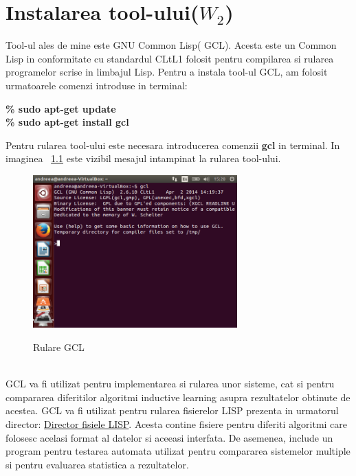\documentclass[a4paper,12pt]{report}
\begin{document}
\vspace{0.5cm}

\chapter{Instalarea tool-ului($W_2$)}
	Tool-ul ales de mine este GNU Common Lisp( GCL). Acesta este un Common Lisp in conformitate cu standardul CLtL1 folosit pentru compilarea si rularea programelor scrise in limbajul Lisp. Pentru a instala tool-ul GCL, am folosit urmatoarele comenzi introduse in terminal:
 
\begin{center}
\textbf{\% sudo apt-get update}\\
\textbf{\% sudo apt-get install gcl}
\end{center}
	Pentru rularea tool-ului este necesara introducerea comenzii \textbf{gcl} in terminal. In imaginea  ~\ref{fig:img5} este vizibil mesajul intampinat la rularea tool-ului.\\
	\begin{figure}[h]
			\centering
			\caption{Rulare GCL}
			\label{fig:img5}
			\includegraphics[width=0.7\textwidth]{fig/img5}\\
\end{figure}\\
	GCL va fi utilizat pentru implementarea si rularea unor sisteme, cat si pentru compararea diferitilor algoritmi inductive learning asupra rezultatelor obtinute de acestea. GCL va fi utilizat pentru rularea fisierelor LISP prezenta in urmatorul director: \href{http://www.cs.northwestern.edu/~paritosh/research/Bote04/v1/carve/mooney/ml-progs/}{Director fisiele LISP}. Acesta contine fisiere pentru diferiti algoritmi care folosesc acelasi format al datelor si aceeasi interfata. De asemenea, include un program pentru testarea automata utilizat pentru compararea sistemelor multiple si pentru evaluarea statistica a rezultatelor.
\end{document}
